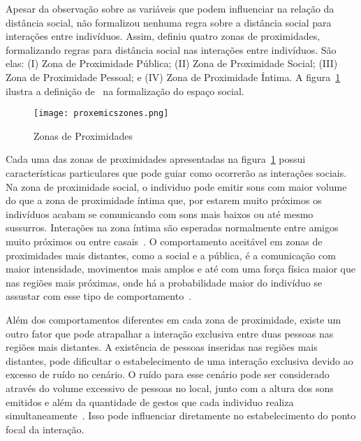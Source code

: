 Apesar da observação sobre as variáveis que podem influenciar na relação da distância social, \textcite{hall:1969} não formalizou nenhuma regra sobre a distância social para interações entre indivíduos. Assim, \textcite{argyle:1988} definiu quatro zonas de proximidades, formalizando regras para distância social nas interações entre indivíduos. São elas: (I) Zona de Proximidade Pública; (II) Zona de Proximidade Social; (III) Zona de Proximidade Pessoal; e (IV) Zona de Proximidade Íntima. A figura~\ref{fig:proximityzones} ilustra a definição de~\textcite{argyle:1988} na formalização do espaço social.

\begin{figure}[ht!]
	\centering
	\begin{minipage}{\textwidth}
		\caption{Zonas de Proximidades}
		\texttt{[image: proxemicszones.png]}
		\label{fig:proximityzones}
	\end{minipage}
\end{figure}

Cada uma das zonas de proximidades apresentadas na figura~\ref{fig:proximityzones} possui características particulares que pode guiar como ocorrerão as interações sociais. Na zona de proximidade social, o individuo pode emitir sons com maior volume do que a zona de proximidade íntima que, por estarem muito próximos os indivíduos acabam se comunicando com sons mais baixos ou até mesmo sussurros. Interações na zona íntima são esperadas normalmente entre amigos muito próximos ou entre casais~\cite{hall:1969, argyle:1988}. O comportamento aceitável em zonas de proximidades mais distantes, como a social e a pública, é a comunicação com maior intensidade, movimentos mais amplos e até com uma força física maior que nas regiões mais próximas, onde há a probabilidade maior do indivíduo se assustar com esse tipo de comportamento~\cite{henkel:2014}.

Além dos comportamentos diferentes em cada zona de proximidade, existe um outro fator que pode atrapalhar a interação exclusiva entre duas pessoas nas regiões mais distantes. A existência de pessoas inseridas nas regiões mais distantes, pode dificultar o estabelecimento de uma interação exclusiva devido ao excesso de ruído no cenário. O ruído para esse cenário pode ser considerado através do volume excessivo de pessoas no local, junto com a altura dos sons emitidos e além da quantidade de gestos que cada individuo realiza simultaneamente~\cite{walters:2009, henkel:2014}. Isso pode influenciar diretamente no estabelecimento do ponto focal da interação.


